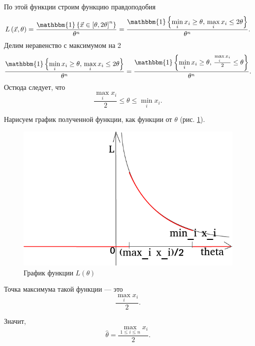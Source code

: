 \begin{enumerate}[label=\alph*)]
  По этой функции строим функцию правдоподобия
  $$L \left( \vec{x}, \theta \right) =
    \frac{ \mathbbm{1} \left\{ \vec{x} \in \left[ \theta, 2 \theta \right]^n \right\} }{ \theta^n} =
    \frac{ \mathbbm{1} \left\{ \min \limits_i x_i \geq \theta, \, \max \limits_i x_i \leq 2 \theta \right\} }{ \theta^n}.$$
  Делим неравенство с максимумом на 2
  $$ \frac{ \mathbbm{1} \left\{ \min \limits_i x_i \geq \theta, \, \max \limits_i x_i \leq 2 \theta \right\} }{ \theta^n} =
    \frac{ \mathbbm{1} \left\{ \min \limits_i x_i \geq \theta,\, \frac{ \max \limits_i x_i}{2} \leq \theta \right\} }{ \theta^n}.$$
  Остюда следует, что
  $$ \frac{ \max \limits_i x_i}{2} \leq
    \theta \leq
    \min \limits_i x_i.$$

  Нарисуем график полученной функции, как функции от $ \theta $ (рис. \ref{fig:4183}).

  \begin{figure}[h!]
    \centering
    \includegraphics[width=.4\textwidth]{./pictures/4_18_3.png}
    \caption{График функции $L \left( \theta \right) $}
    \label{fig:4183}
  \end{figure}

  Точка максимума такой функции --- это
  $$ \frac{ \max \limits_i x_i}{2}.$$

  Значит,
  $$ \hat{ \theta } =
    \frac{ \max \limits_{1 \leq i \leq n} x_i}{2}.$$
\end{enumerate}
